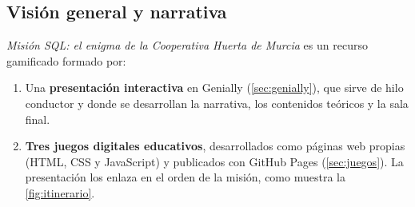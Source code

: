 \documentclass[11pt,a4paper]{article}
\begin{document}
\subsection{Visión general y narrativa}

\emph{Misión SQL: el enigma de la Cooperativa Huerta de Murcia} es un recurso gamificado
formado por:

\begin{enumerate}
  \item Una \textbf{presentación interactiva} en Genially \cite{genially} (\autoref{sec:genially}), que sirve
        de hilo conductor y donde se desarrollan la narrativa, los contenidos teóricos y la
        sala final.
  \item \textbf{Tres juegos digitales educativos}, desarrollados como páginas web propias
        (HTML, CSS y JavaScript) y publicados con GitHub Pages \cite{ghpages} (\autoref{sec:juegos}). La
        presentación los enlaza en el orden de la misión, como muestra la
        \autoref{fig:itinerario}.
\end{enumerate}
\end{document}
